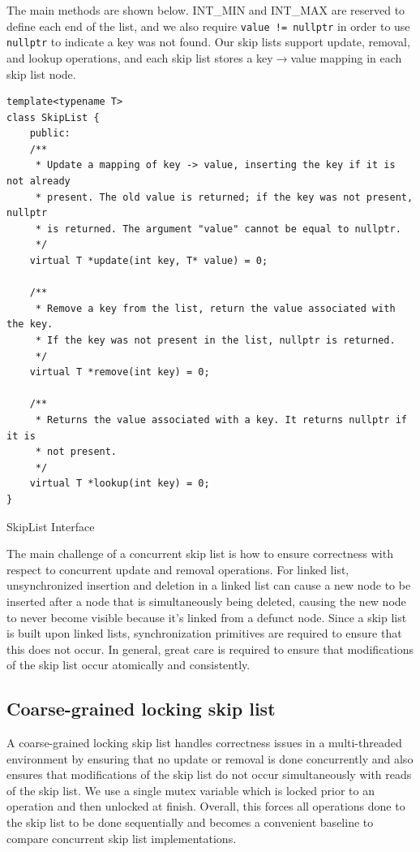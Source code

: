 \documentclass[11pt]{article}
\newcommand{\ttt}[1]{\texttt{#1}}
\begin{document}
 The main methods are shown below. INT\_MIN and INT\_MAX are reserved to define each end of the list, and we also require \ttt{value != nullptr} in order to use \ttt{nullptr} to indicate a key was not found.
 Our skip lists support update, removal, and lookup operations, and each skip list stores a key$\rightarrow$value mapping in each skip list node. 

\begin{listing}[!ht]
\begin{verbatim}
template<typename T>
class SkipList {
    public:
    /**
     * Update a mapping of key -> value, inserting the key if it is not already
     * present. The old value is returned; if the key was not present, nullptr
     * is returned. The argument "value" cannot be equal to nullptr.
     */
    virtual T *update(int key, T* value) = 0;
    
    /**
     * Remove a key from the list, return the value associated with the key.
     * If the key was not present in the list, nullptr is returned. 
     */
    virtual T *remove(int key) = 0;
    
    /**
     * Returns the value associated with a key. It returns nullptr if it is
     * not present.
     */
    virtual T *lookup(int key) = 0;
}
\end{verbatim}
\caption{SkipList Interface}
\label{listing:1}
\end{listing}

The main challenge of a concurrent skip list is how to ensure correctness with respect to concurrent update and removal operations. For linked list, unsynchronized insertion and deletion in a linked list can cause a new node to be inserted after a node that is simultaneously being deleted, causing the new node to never become visible because it's linked from a defunct node. Since a skip list is built upon linked lists, synchronization primitives are required to ensure that this does not occur. In general, great care is required to ensure that modifications of the skip list occur atomically and consistently. 

\subsection{Coarse-grained locking skip list}
A coarse-grained locking skip list handles correctness issues in a multi-threaded environment by ensuring that no update or removal is done concurrently and also ensures that modifications of the skip list do not occur simultaneously with reads of the skip list. We use a single mutex variable which is locked prior to an operation and then unlocked at finish. Overall, this forces all operations done to the skip list to be done sequentially and becomes a convenient baseline to compare concurrent skip list implementations.
\end{document}
